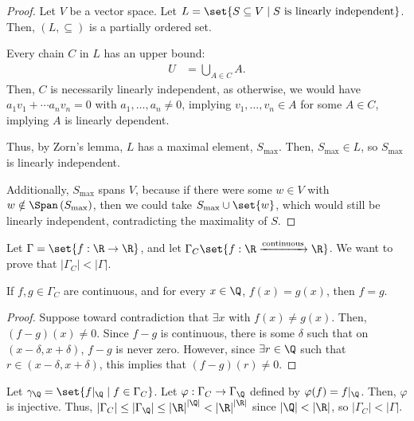 \documentclass[10pt]{mypackage}
\begin{document}
  \begin{proof}
    Let $V$ be a vector space. Let $L = \set{S\subseteq V\mid S\text{ is linearly independent}}$. Then, $\left(L,\subseteq\right)$ is a partially ordered set.\newline

    Every chain $C$ in $L$ has an upper bound:
    \begin{align*}
      U &= \bigcup_{A\in C} A.
    \end{align*}
    Then, $C$ is necessarily linearly independent, as otherwise, we would have $a_1v_1 + \cdots a_nv_n = 0$ with $a_1,\dots,a_n\neq 0$, implying $v_1,\dots,v_n\in A$ for some $A\in C$, implying $A$ is linearly dependent.\newline

    Thus, by Zorn's lemma, $L$ has a maximal element, $S_{\text{max}}$. Then, $S_{\text{max}}\in L$, so $S_{\text{max}}$ is linearly independent.\newline

    Additionally, $S_{\text{max}}$ spans $V$, because if there were some $w\in V$ with $w\notin \Span\left(S_{\text{max}}\right)$, then we could take $S_{\text{max}}\cup \set{w}$, which would still be linearly independent, contradicting the maximality of $S$.
  \end{proof}
  \begin{example}
    Let $\Gamma = \set{f: \R\rightarrow \R}$, and let $\Gamma_{C}\set{f: \R\xrightarrow{\text{continuous}}\R}$. We want to prove that $\left\vert \Gamma_{C} \right\vert < \left\vert \Gamma \right\vert$.
    \begin{lemma}
      If $f,g\in \Gamma_C$ are continuous, and for every $x\in \Q$, $f(x) = g(x)$, then $f=g$.
    \end{lemma}
    \begin{proof}
      Suppose toward contradiction that $\exists x$ with $f(x) \neq g(x)$. Then, $\left(f-g\right)(x) \neq 0$. Since $f-g$ is continuous, there is some $\delta$ such that on $\left(x-\delta,x+\delta\right)$, $f-g$ is never zero. However, since $\exists r\in \Q$ such that $r\in \left(x-\delta,x+\delta\right)$, this implies that $\left(f-g\right)(r) \neq 0$.
    \end{proof}
    Let $\gamma_{\Q} = \set{f|_{\Q}\mid f\in \Gamma_{C}}$. Let $\varphi: \Gamma_{C}\rightarrow \Gamma_{\Q}$ defined by $\varphi(f) = f|_{\Q}$. Then, $\varphi$ is injective. Thus, $\left\vert \Gamma_{C} \right\vert \leq \left\vert \Gamma_{\Q} \right\vert \leq \left\vert \R \right\vert^{\left\vert \Q \right\vert} < \left\vert \R \right\vert^{\left\vert \R \right\vert}$ since $\left\vert \Q \right\vert < \left\vert \R \right\vert$, so $\left\vert \Gamma_{C} \right\vert < \left\vert \Gamma \right\vert$.
  \end{example}
\end{document}
